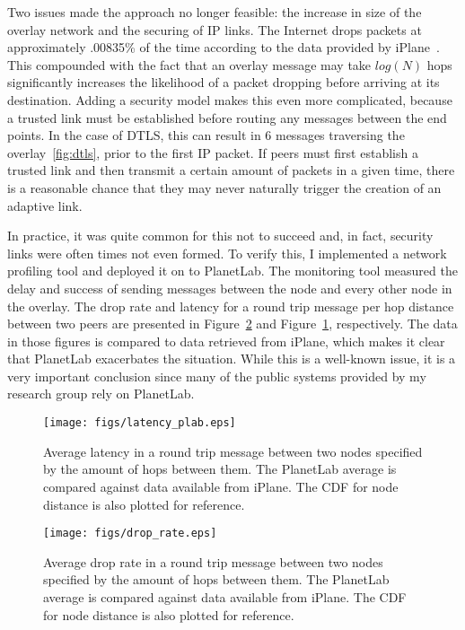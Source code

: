 Two issues made the approach no longer feasible:  the increase in size of the
overlay network and the securing of IP links.  The Internet drops packets at
approximately .00835\% of the time according to the data provided by
iPlane~\cite{iplane}.  This compounded with the fact that an overlay message
may take $log(N)$ hops significantly increases the likelihood of a packet
dropping before arriving at its destination.  Adding a security model makes
this even more complicated, because a trusted link must be established before
routing any messages between the end points.  In the case of DTLS, this can
result in 6 messages traversing the overlay~\ref{fig:dtls}, prior to the first
IP packet.  If peers must first establish a trusted link and then transmit a
certain amount of packets in a given time, there is a reasonable chance that
they may never naturally trigger the creation of an adaptive link.

In practice, it was quite common for this not to succeed and, in fact, security
links were often times not even formed.  To verify this, I implemented a
network profiling tool and deployed it on to PlanetLab.  The monitoring tool
measured the delay and success of sending messages between the node and every
other node in the overlay.  The drop rate and latency for a round trip message
per hop distance between two peers are presented in
Figure~\ref{fig:drop_rate_plab} and Figure~\ref{fig:latency_plab},
respectively.  The data in those figures is compared to data retrieved from
iPlane, which makes it clear that PlanetLab exacerbates the situation.  While
this is a well-known issue, it is a very important conclusion since many of the
public systems provided by my research group rely on PlanetLab.

\begin{figure}[ht]
\centering
\texttt{[image: figs/latency\_plab.eps]}
\caption[Latency in PlanetLab deployment]{Average latency in a round trip
message between two nodes specified by the amount of hops between them.  The
PlanetLab average is compared against data available from iPlane.  The CDF for
node distance is also plotted for reference.}
\label{fig:latency_plab}
\end{figure}

\begin{figure}[ht]
\centering
\texttt{[image: figs/drop\_rate.eps]}
\caption[Drop rate in PlanetLab deployment]{Average drop rate in a round trip
message between two nodes specified by the amount of hops between them.  The
PlanetLab average is compared against data available from iPlane.  The CDF for
node distance is also plotted for reference.}
\label{fig:drop_rate_plab}
\end{figure}

